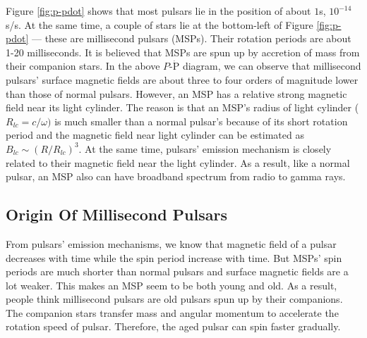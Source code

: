 \documentclass[12pt]{report}
\begin{document}
          Figure \ref{fig:p-pdot} shows that most pulsars lie in the position of about 
          $1$s, $10^{-14}$s/s. At the same time, a couple of stars lie at the bottom-left 
          of Figure \ref{fig:p-pdot} --- these are millisecond pulsars (MSPs). Their 
          rotation periods are about 1-20 milliseconds. It is believed that MSPs are spun 
          up by accretion of mass from their companion stars. In the above 
          $P$-$\dot{\mbox{P}}$ diagram, we can observe that millisecond pulsars' 
          surface magnetic fields are about three to four orders of magnitude lower than those
          of normal pulsars. However, an MSP has a relative strong magnetic field near its 
          light cylinder. The reason is that an MSP's radius 
          of light cylinder ($R_{lc}=c/\omega)$ is much smaller than a normal pulsar's 
          because of its short rotation period and the magnetic field near light cylinder can
          be estimated as $B_{lc}\sim\left(R/R_{lc}\right)^3$. At the same time, 
          pulsars' emission mechanism is closely related to their magnetic field near the light 
          cylinder. As a result, like a normal pulsar, an MSP also can have broadband spectrum 
          from radio to gamma rays. 
          \subsection{Origin Of Millisecond Pulsars}
            From pulsars' emission mechanisms, we know that magnetic field of a pulsar 
            decreases with time while the spin period increase with time. But MSPs' spin 
            periods are much shorter than normal pulsars and surface magnetic fields are a 
            lot weaker. This makes an MSP seem to be both young and old. As a result,
            people think millisecond pulsars are old pulsars spun up by their companions. 
            The companion stars transfer mass and angular momentum to accelerate the rotation
            speed of pulsar. Therefore, the aged pulsar can spin faster gradually. 
\end{document}
